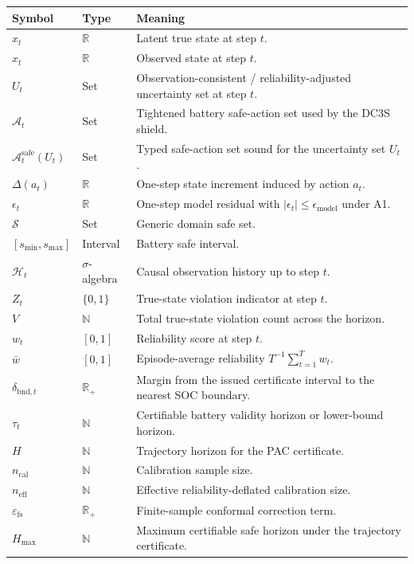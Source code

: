 \documentclass[11pt]{article}
\newcommand{\R}{\mathbb{R}}
\newcommand{\N}{\mathbb{N}}
\newcommand{\1}{\mathbf{1}}
\begin{document}
\begin{table}[h]
\centering
\begin{tabular}{@{}llp{9.5cm}@{}}
\toprule
Symbol & Type & Meaning \\
\midrule
$x_t$ & $\R$ & Latent true state at step $t$. \\
$\hat{x}_t$ & $\R$ & Observed state at step $t$. \\
$U_t$ & Set & Observation-consistent / reliability-adjusted uncertainty set at step $t$. \\
$\mathcal{A}_t$ & Set & Tightened battery safe-action set used by the DC3S shield. \\
$\mathcal{A}_t^{\mathrm{safe}}(U_t)$ & Set & Typed safe-action set sound for the uncertainty set $U_t$. \\
$\Delta(a_t)$ & $\R$ & One-step state increment induced by action $a_t$. \\
$\epsilon_t$ & $\R$ & One-step model residual with $|\epsilon_t| \le \epsilon_{\mathrm{model}}$ under A1. \\
$\mathcal{S}$ & Set & Generic domain safe set. \\
$[s_{\min}, s_{\max}]$ & Interval & Battery safe interval. \\
$\mathcal{H}_t$ & $\sigma$-algebra & Causal observation history up to step $t$. \\
$Z_t$ & $\{0,1\}$ & True-state violation indicator at step $t$. \\
$V$ & $\N$ & Total true-state violation count across the horizon. \\
$w_t$ & $[0,1]$ & Reliability score at step $t$. \\
$\bar w$ & $[0,1]$ & Episode-average reliability $T^{-1}\sum_{t=1}^T w_t$. \\
$\delta_{\mathrm{bnd},t}$ & $\R_+$ & Margin from the issued certificate interval to the nearest SOC boundary. \\
$\tau_t$ & $\N$ & Certifiable battery validity horizon or lower-bound horizon. \\
$H$ & $\N$ & Trajectory horizon for the PAC certificate. \\
$n_{\mathrm{cal}}$ & $\N$ & Calibration sample size. \\
$n_{\mathrm{eff}}$ & $\N$ & Effective reliability-deflated calibration size. \\
$\varepsilon_{\mathrm{fs}}$ & $\R_+$ & Finite-sample conformal correction term. \\
$H_{\max}$ & $\N$ & Maximum certifiable safe horizon under the trajectory certificate. \\
\bottomrule
\end{tabular}
\end{table}
\end{document}
